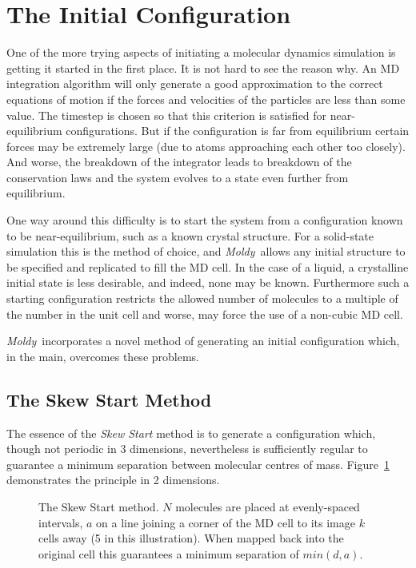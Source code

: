 \documentclass[a4paper,twoside]{report}
\newcommand{\moldy}{\emph{Moldy}}
\begin{document}
\section{The Initial Configuration}%
One of the more trying aspects of initiating a molecular dynamics
simulation is getting it started in the first place.  It is not hard
to see the reason why.  An MD integration algorithm will only generate
a good approximation to the correct equations of motion if the forces
and velocities of the particles are less than some value.  The
timestep is chosen so that this criterion is satisfied for
near-equilibrium configurations.  But if the configuration is far from
equilibrium certain forces may be extremely large (due to atoms
approaching each other too closely).  And worse, the breakdown of the
integrator leads to breakdown of the conservation laws and the
system evolves to a state even further from equilibrium.

One way around this difficulty is to start the system from a
configuration known to be near-equilibrium, such as a known crystal
structure.   For a solid-state simulation this is the method of
choice, and \moldy\ allows any initial structure to be specified and
replicated to fill the MD cell.  In the case of a liquid, a
crystalline initial state is less desirable, and indeed, none may be
known.  Furthermore such a starting configuration restricts the
allowed number of molecules to a multiple of the number in the unit
cell and worse, may force the use of a non-cubic MD cell.

\moldy\ incorporates a novel method of generating an initial
configuration which, in the main, overcomes these problems.
\subsection{The Skew Start Method}
\label{sec:skewstart}
The essence of the \emph{Skew Start} method is to generate a
configuration which, though not periodic in 3 dimensions, nevertheless
is sufficiently regular to guarantee a minimum separation between
molecular centres of mass.  Figure~\ref{fig:skewstart} demonstrates
the principle in 2 dimensions.

\begin{figure}
\setlength{\unitlength}{0.012500in}%

\caption[The Skew Start method]{The Skew Start method.  $N$ molecules
  are placed at evenly-spaced intervals, $a$ on a line joining a
  corner of the MD cell to its image $k$ cells away (5 in this
  illustration).  When mapped back into the original cell this
  guarantees a minimum separation of $min(d,a)$.}
\label{fig:skewstart}
\end{figure}
\end{document}
